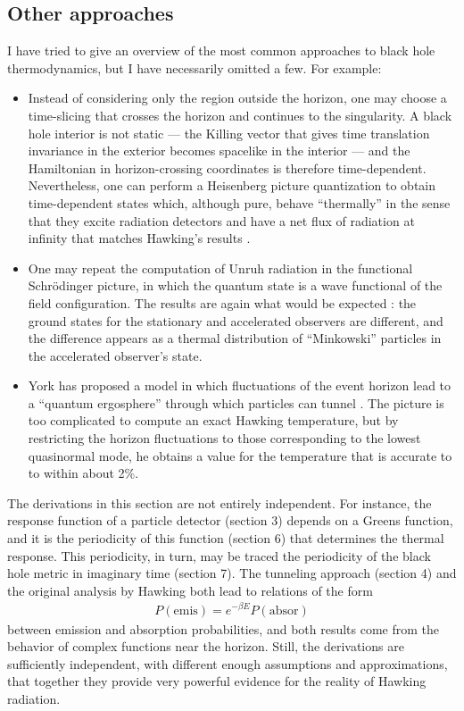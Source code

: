 \documentclass[12pt]{article}
\begin{document}
\subsection{Other approaches \label{otherb}}

I have tried to give an overview of the most common approaches to
black hole thermodynamics, but I have necessarily omitted a few.  
For example:

\begin{itemize}
\item Instead of considering only  the region outside the horizon, 
one may choose a time-slicing that crosses the horizon and continues 
to the singularity.  A black hole interior is not static --- the Killing 
vector that gives time translation invariance in the exterior 
becomes spacelike in the interior --- and the Hamiltonian in 
horizon-crossing coordinates is therefore time-dependent.
Nevertheless, one can perform a Heisenberg picture quantization to
obtain time-dependent states which, although pure, behave
``thermally'' in the sense that they excite radiation detectors and have
a net flux of radiation at infinity that matches Hawking's results
\cite{Melnikov}.  

\item One may repeat the computation of Unruh radiation in the functional
Schr{\"o}dinger picture, in which the quantum state is a wave functional
of the field configuration.   The results are again what would be expected 
\cite{Freese}: the ground states for the stationary and accelerated 
observers are different, and the difference appears as a thermal
distribution of ``Minkowski'' particles in the accelerated observer's
state. 

\item York has proposed a model in which fluctuations of 
the event horizon lead to a ``quantum ergosphere'' through which
particles can tunnel \cite{York}.  The picture is too complicated
to  compute an exact Hawking temperature, but by 
restricting the horizon fluctuations to those corresponding to the
lowest quasinormal mode, he obtains a value for the temperature 
that is accurate to to within about 2\%.
\end{itemize}

The derivations  
in this section are not  entirely independent.  For instance, the 
response function of a particle detector (section 3)
depends on a Greens function, and it is the periodicity of 
this function (section 6) that determines the thermal response.   
This periodicity, in turn, may be traced the periodicity 
of the black hole metric in imaginary time (section 7).  The 
tunneling approach (section 4) and the original analysis
by Hawking both lead to relations of the form
\begin{align*}
P(\mathrm{emis}) = e^{-\beta E}P(\mathrm{absor})
\end{align*}
between emission and absorption probabilities, and
both results come from the behavior of complex functions
near the horizon.   Still, the derivations
are sufficiently independent, with different enough assumptions and
approximations, that together they provide very powerful evidence for
the reality of Hawking radiation.
\end{document}

